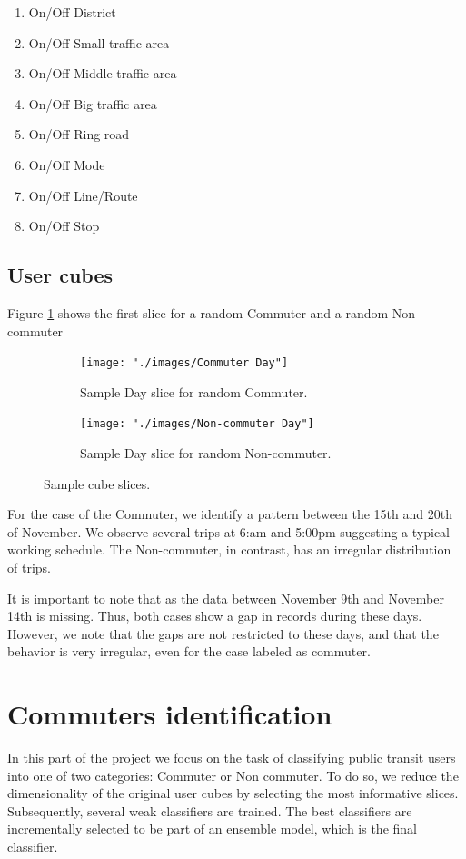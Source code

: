 \documentclass{article}
\begin{document}
\begin{enumerate}
\item On/Off District
\item On/Off Small traffic area
\item On/Off Middle traffic area
\item On/Off Big traffic area
\item On/Off Ring road
\item On/Off Mode
\item On/Off Line/Route
\item On/Off Stop
\end{enumerate}

\subsection{User cubes}
Figure \ref{fig:preprocessing/cubes} shows the first slice for a random Commuter and a random Non-commuter


\begin{figure}[H]
  \centering
  \begin{subfigure}[b]{.7\textwidth}
  	\centering
	\texttt{[image: "./images/Commuter Day"]}
  	\caption{Sample Day slice for random Commuter.}
  \end{subfigure}
  \begin{subfigure}[b]{.7\textwidth}
  	\centering
	\texttt{[image: "./images/Non-commuter Day"]}
  	\caption{Sample Day slice for random Non-commuter.}
  \end{subfigure}
  \caption{Sample cube slices.}
  	\label{fig:preprocessing/cubes} %
\end{figure}

For the case of the Commuter, we identify a pattern between the 15th and 20th of November. We observe several trips at 6:am and 5:00pm suggesting a typical working schedule. The Non-commuter, in contrast, has an irregular distribution of trips. 

It is important to note that as the data between November 9th and November 14th is missing. Thus, both cases show a gap in records during these days. However, we note that the gaps are not restricted to these days, and that the behavior is very irregular, even for the case labeled as commuter. 


\newpage
\section{Commuters identification}
\label{sec:partII}
In this part of the project we focus on the task of classifying public transit users into one of two categories: Commuter or Non commuter. To do so, we reduce the dimensionality of the original user cubes by selecting the most informative slices. Subsequently, several weak classifiers are trained. The best classifiers are incrementally selected to be part of an ensemble model, which is the final classifier.
\end{document}
